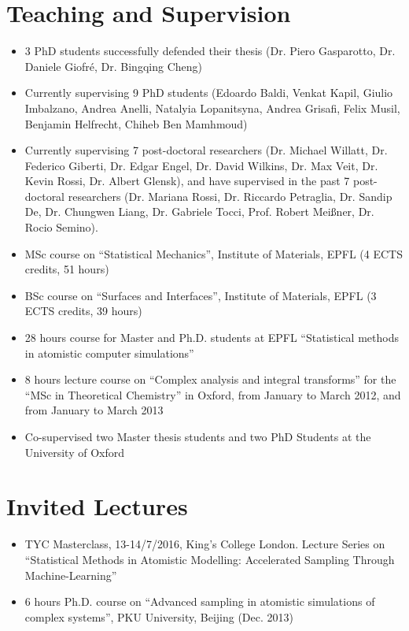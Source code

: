 \section{Teaching and Supervision}
\begin{itemize}
\item 3 PhD students successfully defended their thesis (Dr. Piero Gasparotto, Dr. Daniele Giofr\'e, Dr. Bingqing Cheng)
\item Currently supervising 9 PhD students (Edoardo Baldi, Venkat Kapil, Giulio Imbalzano, Andrea Anelli, Natalyia Lopanitsyna, Andrea Grisafi, Felix Musil, Benjamin Helfrecht, Chiheb Ben Mamhmoud)
\item Currently supervising 7 post-doctoral researchers (Dr. Michael Willatt, Dr. Federico Giberti, Dr. Edgar Engel, Dr. David Wilkins, Dr. Max Veit, Dr. Kevin Rossi, Dr. Albert Glensk), and have supervised in the past 7 post-doctoral researchers (Dr. Mariana Rossi, Dr. Riccardo Petraglia, Dr. Sandip De, Dr. Chungwen Liang, Dr. Gabriele Tocci, Prof. Robert Meißner, Dr. Rocio Semino).
\item MSc course on “Statistical Mechanics”, Institute of Materials, EPFL (4 ECTS credits, 51 hours)
\item BSc course on “Surfaces and Interfaces”, Institute of Materials, EPFL (3 ECTS credits, 39 hours)
\item 28 hours course for Master and Ph.D. students at EPFL “Statistical methods in atomistic computer simulations”
\item 8 hours lecture course on “Complex analysis and integral transforms” for the “MSc in Theoretical Chemistry” in Oxford, from January to March 2012, and from January to March 2013
\item Co-supervised two Master thesis students and two PhD Students at the University of Oxford
\end{itemize}

\section{Invited Lectures}
\begin{itemize}
\item TYC Masterclass, 13-14/7/2016, King's College London. Lecture Series on “Statistical Methods in Atomistic Modelling: Accelerated Sampling Through Machine-Learning”
\item 6 hours Ph.D. course on “Advanced sampling in atomistic simulations of complex systems”, PKU University, Beijing (Dec. 2013)
\end{itemize}

